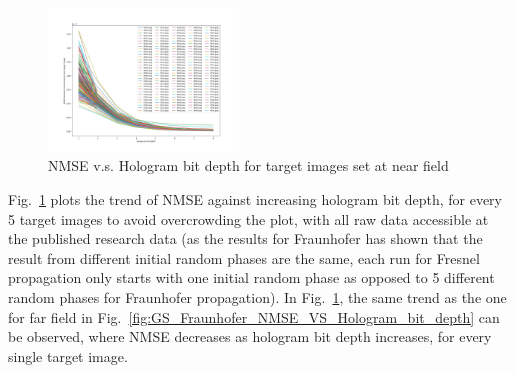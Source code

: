 	\begin{figure} [ht]
	   \begin{center}
	   \includegraphics[trim={80 50 90 70}, clip, width = 0.45\textwidth]{GS_Fraunhofer_NMSE_VS_Hologram bit depth.png}
	   \end{center}
	   \caption{\label{fig:GS_Fresnel0.1_NMSE_VS_Hologram_bit_depth} NMSE v.s. Hologram bit depth for target images set at near field}
	\end{figure}

	Fig.~\ref{fig:GS_Fresnel0.1_NMSE_VS_Hologram_bit_depth} plots the trend of NMSE against increasing hologram bit depth, for every 5 target images to avoid overcrowding the plot, with all raw data accessible at the published research data \cite{research_data_Sha2024} (as the results for Fraunhofer has shown that the result from different initial random phases are the same, each run for Fresnel propagation only starts with one initial random phase as opposed to 5 different random phases for Fraunhofer propagation). In Fig.~\ref{fig:GS_Fresnel0.1_NMSE_VS_Hologram_bit_depth}, the same trend as the one for far field in Fig.~\ref{fig:GS_Fraunhofer_NMSE_VS_Hologram_bit_depth} can be observed, where NMSE decreases as hologram bit depth increases, for every single target image.


